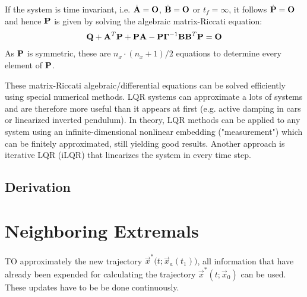 		If the system is time invariant, i.e. \( \dot{\bm{\mathrm{A}}} = \bm{\mathrm{O}} \), \( \dot{\bm{\mathrm{B}}} = \bm{\mathrm{O}} \) or \( t_f = \infty \), it follows \( \dot{\bm{\mathrm{P}}} = \bm{\mathrm{O}} \) and hence \(\bm{\mathrm{P}}\) is given by solving the algebraic matrix-Riccati equation:
		\begin{align*}
			\bm{\mathrm{Q}} + \bm{\mathrm{A}}^T \bm{\mathrm{P}} + \bm{\mathrm{P}} \bm{\mathrm{A}} - \bm{\mathrm{P}} \bm{\mathrm{\Gamma}}^{-1} \bm{\mathrm{B}} \bm{\mathrm{B}}^T \bm{\mathrm{P}} = \bm{\mathrm{O}}
		\end{align*}
		As \(\bm{\mathrm{P}}\) is symmetric, these are \( n_x \cdot (n_x + 1) / 2 \) equations to determine every element of \(\bm{\mathrm{P}}\).

		These matrix-Riccati algebraic/differential equations can be solved efficiently using special numerical methods. LQR systems can approximate a lots of systems and are therefore more useful than it appears at first (e.g. active damping in cars or linearized inverted pendulum). In theory, LQR methods can be applied to any system using an infinite-dimensional nonlinear embedding ("measurement") which can be finitely approximated, still yielding good results. Another approach is iterative LQR (iLQR) that linearizes the system in every time step.

		\subsection{Derivation} %

	\section{Neighboring Extremals}
		TO approximately the new trajectory \( \vec{x}^\ast\big(t; \vec{x}_a(t_1)\big) \), all information that have already been expended for calculating the trajectory \( \vec{x}^\ast(t; \vec{x}_0) \) can be used. These updates have to be be done continuously.


